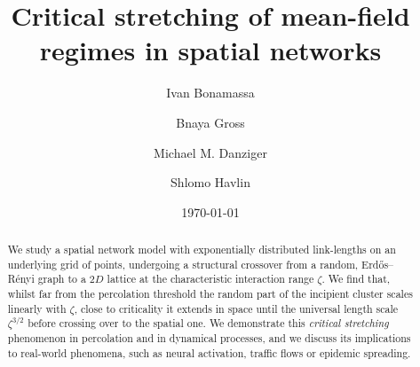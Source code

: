 \documentclass[aps, groupedaddress, superscriptaddress, prl, reprint]{revtex4-1}
\begin{document}
\title{Critical stretching of mean-field regimes in spatial networks}
\author{Ivan Bonamassa}
\author{Bnaya Gross}
\author{Michael M. Danziger}
\author{Shlomo Havlin}
\date{\today}

\begin{abstract}
We study a spatial network model with exponentially distributed link-lengths on an underlying grid of points, undergoing a structural crossover from a random, Erd\H{o}s--R\'enyi graph to a $2D$ lattice at the characteristic interaction range $\zeta$.
We find that, whilst far from the percolation threshold the random part of the incipient cluster scales linearly with $\zeta$, close to criticality it extends in space until the universal length scale $\zeta^{3/2}$ before crossing over to the spatial one. 
We demonstrate this {\em critical stretching} phenomenon in percolation and in dynamical processes, and we discuss its implications to real-world phenomena, such as neural activation, traffic flows or epidemic spreading.
\end{abstract}
\end{document}
